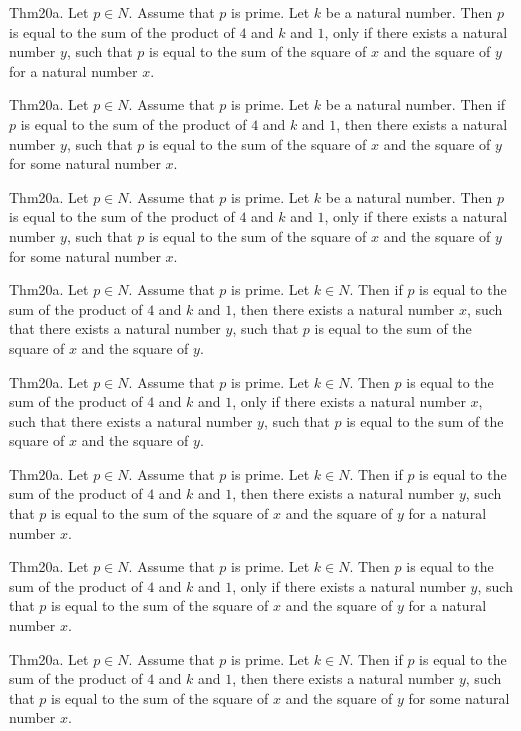 \documentclass{article}
\begin{document}
Thm20a. Let $p \in N$. Assume that $p$ is prime. Let $k$ be a natural number. Then $p$ is equal to the sum of the product of $4$ and $k$ and $1$, only if there exists a natural number $y$, such that $p$ is equal to the sum of the square of $x$ and the square of $y$ for a natural number $x$.

Thm20a. Let $p \in N$. Assume that $p$ is prime. Let $k$ be a natural number. Then if $p$ is equal to the sum of the product of $4$ and $k$ and $1$, then there exists a natural number $y$, such that $p$ is equal to the sum of the square of $x$ and the square of $y$ for some natural number $x$.

Thm20a. Let $p \in N$. Assume that $p$ is prime. Let $k$ be a natural number. Then $p$ is equal to the sum of the product of $4$ and $k$ and $1$, only if there exists a natural number $y$, such that $p$ is equal to the sum of the square of $x$ and the square of $y$ for some natural number $x$.

Thm20a. Let $p \in N$. Assume that $p$ is prime. Let $k \in N$. Then if $p$ is equal to the sum of the product of $4$ and $k$ and $1$, then there exists a natural number $x$, such that there exists a natural number $y$, such that $p$ is equal to the sum of the square of $x$ and the square of $y$.

Thm20a. Let $p \in N$. Assume that $p$ is prime. Let $k \in N$. Then $p$ is equal to the sum of the product of $4$ and $k$ and $1$, only if there exists a natural number $x$, such that there exists a natural number $y$, such that $p$ is equal to the sum of the square of $x$ and the square of $y$.

Thm20a. Let $p \in N$. Assume that $p$ is prime. Let $k \in N$. Then if $p$ is equal to the sum of the product of $4$ and $k$ and $1$, then there exists a natural number $y$, such that $p$ is equal to the sum of the square of $x$ and the square of $y$ for a natural number $x$.

Thm20a. Let $p \in N$. Assume that $p$ is prime. Let $k \in N$. Then $p$ is equal to the sum of the product of $4$ and $k$ and $1$, only if there exists a natural number $y$, such that $p$ is equal to the sum of the square of $x$ and the square of $y$ for a natural number $x$.

Thm20a. Let $p \in N$. Assume that $p$ is prime. Let $k \in N$. Then if $p$ is equal to the sum of the product of $4$ and $k$ and $1$, then there exists a natural number $y$, such that $p$ is equal to the sum of the square of $x$ and the square of $y$ for some natural number $x$.
\end{document}
